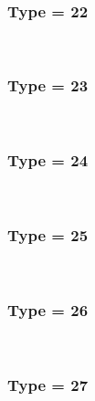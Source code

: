 \documentclass{article}
\begin{document}
            \\
        
        
        
            \subsubsection*{Type = 22}    
            
            \\
        
        
        
            \subsubsection*{Type = 23}    
            
            \\
        
        
        
            \subsubsection*{Type = 24}    
            
            \\
        
        
        
            \subsubsection*{Type = 25}    
            
            \\
        
        
        
            \subsubsection*{Type = 26}    
            
            \\
        
        
        
            \subsubsection*{Type = 27}    
            
            \\
        
\end{document}
